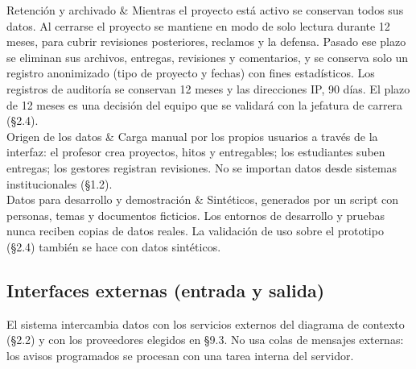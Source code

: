 \documentclass[10pt,a4paper]{article}
\newenvironment{kv}[1][4.6cm]
  {\footnotesize\setlength{\extrarowheight}{3pt}\xltabular{\linewidth}{|E{#1}|L|}\hline}
  {\endxltabular}
\newcommand{\kvrow}[2]{#1 & #2 \\ \hline}
\begin{document}
\begin{kv}
\kvrow{Retención y archivado}{Mientras el proyecto está activo se conservan todos sus datos. Al cerrarse el proyecto se mantiene en modo de solo lectura durante 12 meses, para cubrir revisiones posteriores, reclamos y la defensa. Pasado ese plazo se eliminan sus archivos, entregas, revisiones y comentarios, y se conserva solo un registro anonimizado (tipo de proyecto y fechas) con fines estadísticos. Los registros de auditoría se conservan 12 meses y las direcciones IP, 90 días. El plazo de 12 meses es una decisión del equipo que se validará con la jefatura de carrera (§2.4).}
\kvrow{Origen de los datos}{Carga manual por los propios usuarios a través de la interfaz: el profesor crea proyectos, hitos y entregables; los estudiantes suben entregas; los gestores registran revisiones. No se importan datos desde sistemas institucionales (§1.2).}
\kvrow{Datos para desarrollo y demostración}{Sintéticos, generados por un script con personas, temas y documentos ficticios. Los entornos de desarrollo y pruebas nunca reciben copias de datos reales. La validación de uso sobre el prototipo (§2.4) también se hace con datos sintéticos.}
\end{kv}

\subsection{Interfaces externas (entrada y salida)}
El sistema intercambia datos con los servicios externos del diagrama de contexto (§2.2) y con los proveedores elegidos en §9.3. No usa colas de mensajes externas: los avisos programados se procesan con una tarea interna del servidor.
\end{document}
